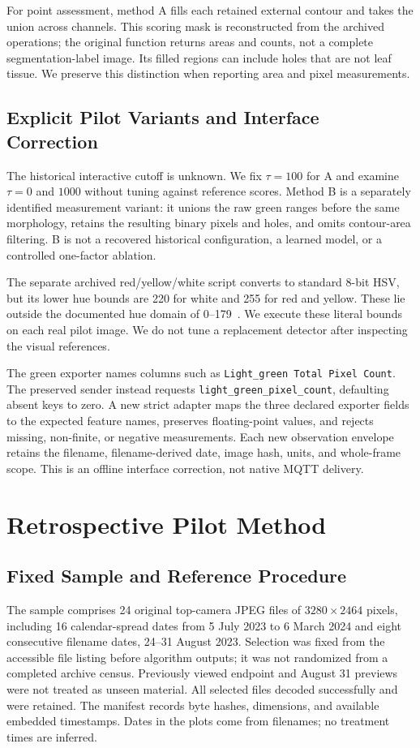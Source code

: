 \documentclass[runningheads]{llncs}
\newcommand{\code}[1]{\texttt{#1}}
\begin{document}
For point assessment, method A fills each retained external contour and takes the union across channels. This scoring mask is reconstructed from the archived operations; the original function returns areas and counts, not a complete segmentation-label image. Its filled regions can include holes that are not leaf tissue. We preserve this distinction when reporting area and pixel measurements.

\subsection{Explicit Pilot Variants and Interface Correction}
The historical interactive cutoff is unknown. We fix $\tau=100$ for A and examine $\tau=0$ and $1000$ without tuning against reference scores. Method B is a separately identified measurement variant: it unions the raw green ranges before the same morphology, retains the resulting binary pixels and holes, and omits contour-area filtering. B is not a recovered historical configuration, a learned model, or a controlled one-factor ablation.

The separate archived red/yellow/white script converts to standard 8-bit HSV, but its lower hue bounds are 220 for white and 255 for red and yellow. These lie outside the documented hue domain of 0--179~\cite{opencvcolour}. We execute these literal bounds on each real pilot image. We do not tune a replacement detector after inspecting the visual references.

The green exporter names columns such as \code{Light\_green Total Pixel Count}. The preserved sender instead requests \code{light\_green\_pixel\_count}, defaulting absent keys to zero. A new strict adapter maps the three declared exporter fields to the expected feature names, preserves floating-point values, and rejects missing, non-finite, or negative measurements. Each new observation envelope retains the filename, filename-derived date, image hash, units, and whole-frame scope. This is an offline interface correction, not native MQTT delivery.

\section{Retrospective Pilot Method}
\label{sec:method}
\subsection{Fixed Sample and Reference Procedure}
The sample comprises 24 original top-camera JPEG files of $3280\times2464$ pixels, including 16 calendar-spread dates from 5 July 2023 to 6 March 2024 and eight consecutive filename dates, 24--31 August 2023. Selection was fixed from the accessible file listing before algorithm outputs; it was not randomized from a completed archive census. Previously viewed endpoint and August 31 previews were not treated as unseen material. All selected files decoded successfully and were retained. The manifest records byte hashes, dimensions, and available embedded timestamps. Dates in the plots come from filenames; no treatment times are inferred.
\end{document}
